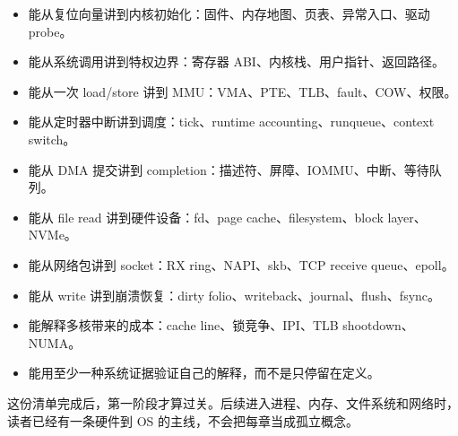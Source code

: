 \begin{itemize}
\tightlist
\item 能从复位向量讲到内核初始化：固件、内存地图、页表、异常入口、驱动 probe。
\item 能从系统调用讲到特权边界：寄存器 ABI、内核栈、用户指针、返回路径。
\item 能从一次 load/store 讲到 MMU：VMA、PTE、TLB、fault、COW、权限。
\item 能从定时器中断讲到调度：tick、runtime accounting、runqueue、context switch。
\item 能从 DMA 提交讲到 completion：描述符、屏障、IOMMU、中断、等待队列。
\item 能从 file read 讲到硬件设备：fd、page cache、filesystem、block layer、NVMe。
\item 能从网络包讲到 socket：RX ring、NAPI、skb、TCP receive queue、epoll。
\item 能从 write 讲到崩溃恢复：dirty folio、writeback、journal、flush、fsync。
\item 能解释多核带来的成本：cache line、锁竞争、IPI、TLB shootdown、NUMA。
\item 能用至少一种系统证据验证自己的解释，而不是只停留在定义。
\end{itemize}

这份清单完成后，第一阶段才算过关。后续进入进程、内存、文件系统和网络时，读者已经有一条硬件到 OS 的主线，不会把每章当成孤立概念。
